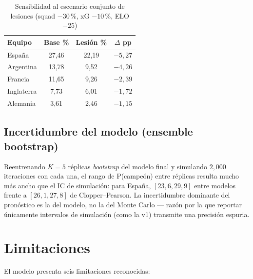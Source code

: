 \documentclass[conference]{IEEEtran}
\begin{document}
\begin{table}[!t]
  \caption{Sensibilidad al escenario conjunto de lesiones
    (squad $-30$\,\%, xG $-10$\,\%, ELO $-25$)}
  \label{tab:sens}
  \centering
  \renewcommand{\arraystretch}{1.15}
  \begin{tabular}{@{}lccc@{}}
    \toprule
    \textbf{Equipo} & \textbf{Base \%} & \textbf{Lesi\'on \%} & \textbf{$\Delta$ pp} \\
    \midrule
    Espa\~na        & 27{,}46          & 22{,}19              & $-5{,}27$            \\
    Argentina       & 13{,}78          & 9{,}52               & $-4{,}26$            \\
    Francia         & 11{,}65          & 9{,}26               & $-2{,}39$            \\
    Inglaterra      & 7{,}73           & 6{,}01               & $-1{,}72$            \\
    Alemania        & 3{,}61           & 2{,}46               & $-1{,}15$            \\
    \bottomrule
  \end{tabular}
\end{table}

\subsection{Incertidumbre del modelo (ensemble bootstrap)}

Reentrenando $K{=}5$ r\'eplicas \emph{bootstrap} del modelo final y
simulando $2{,}000$ iteraciones con cada una, el rango de P(campe\'on)
entre r\'eplicas resulta mucho m\'as ancho que el IC de simulaci\'on:
para Espa\~na, $[23{,}6, 29{,}9]$ entre modelos frente a
$[26{,}1, 27{,}8]$ de Clopper--Pearson. La incertidumbre dominante del
pron\'ostico es la del modelo, no la del Monte Carlo --- raz\'on por la
que reportar \'unicamente intervalos de simulaci\'on (como la v1)
transmite una precisi\'on espuria.

\section{Limitaciones}
\label{sec:limits}

El modelo presenta seis limitaciones reconocidas:
\end{document}
